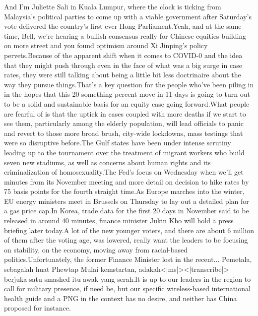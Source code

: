 \documentclass{article}%
\begin{document}
And I'm Juliette Sali in Kuala Lumpur, where the clock is ticking from Malaysia's political parties to come up with a viable government after Saturday's vote delivered the country's first ever Hong Parliament.Yeah, and at the same time, Bell, we're hearing a bullish consensus really for Chinese equities building on more street and you found optimism around Xi Jinping's policy pervets.Because of the apparent shift when it comes to COVID{-}0 and the idea that they might push through even in the face of what was a big surge in case rates, they were still talking about being a little bit less doctrinaire about the way they pursue things.That's a key question for the people who've been piling in in the hopes that this 20{-}something percent move in 11 days is going to turn out to be a solid and sustainable basis for an equity case going forward.What people are fearful of is that the uptick in cases coupled with more deaths if we start to see them, particularly among the elderly population, will lead officials to panic and revert to those more broad brush, city{-}wide lockdowns, mass testings that were so disruptive before.The Gulf states have been under intense scrutiny leading up to the tournament over the treatment of migrant workers who build seven new stadiums, as well as concerns about human rights and its criminalization of homosexuality.The Fed's focus on Wednesday when we'll get minutes from its November meeting and more detail on decision to hike rates by 75 basis points for the fourth straight time.As Europe marches into the winter, EU energy ministers meet in Brussels on Thursday to lay out a detailed plan for a gas price cap.In Korea, trade data for the first 20 days in November said to be released in around 40 minutes, finance minister Jukin Kho will hold a press briefing later today.A lot of the new younger voters, and there are about 6 million of them after the voting age, was lowered, really want the leaders to be focusing on stability, on the economy, moving away from racial{-}based politics.Unfortunately, the former Finance Minister lost in the recent...  Pemetala, sebagalah huat Phewtap Mulai kemstartan, adakah<|ms|><|transcribe|> berjuka satu smashed itu awak yang serah.It is up to our leaders in the region to call for military presence, if need be, but our specific wireless{-}based international health guide and a PNG in the context has no desire, and neither has China proposed for instance.%
\end{document}
